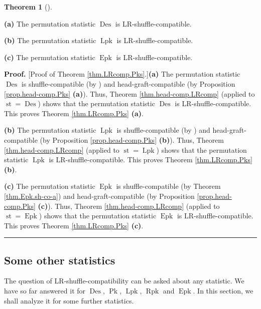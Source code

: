 \documentclass[numbers=enddot,12pt,final,onecolumn,notitlepage]{scrartcl}%
\theoremstyle{definition}
\newtheorem{theo}{Theorem}[section]
\newenvironment{theorem}[1][]
{\begin{theo}[#1]\begin{leftbar}}
{\end{leftbar}\end{theo}}
\newenvironment{proof}[1][Proof]{\noindent\textbf{#1.} }{\ \rule{0.5em}{0.5em}}
\begin{document}
\begin{theorem}
\label{thm.LRcomp.Pks}\textbf{(a)} The permutation statistic
$\operatorname{Des}$ is LR-shuffle-compatible.

\textbf{(b)} The permutation statistic $\operatorname*{Lpk}$ is LR-shuffle-compatible.

\textbf{(c)} The permutation statistic $\operatorname{Epk}$ is LR-shuffle-compatible.
\end{theorem}

\begin{proof}
[Proof of Theorem \ref{thm.LRcomp.Pks}.]\textbf{(a)} The permutation statistic
$\operatorname{Des}$ is shuffle-compatible (by \cite[\S 2.4]{part1}) and
head-graft-compatible (by Proposition \ref{prop.head-comp.Pks} \textbf{(a)}).
Thus, Theorem \ref{thm.head-comp.LRcomp} (applied to $\operatorname{st}
=\operatorname{Des}$) shows that the permutation statistic
$\operatorname{Des}$ is LR-shuffle-compatible. This proves Theorem
\ref{thm.LRcomp.Pks} \textbf{(a)}.

\textbf{(b)} The permutation statistic $\operatorname*{Lpk}$ is
shuffle-compatible (by \cite[Theorem 4.9 \textbf{(a)}]{part1}) and
head-graft-compatible (by Proposition \ref{prop.head-comp.Pks} \textbf{(b)}).
Thus, Theorem \ref{thm.head-comp.LRcomp} (applied to $\operatorname{st}
=\operatorname{Lpk}$) shows that the permutation statistic
$\operatorname{Lpk}$ is LR-shuffle-compatible. This proves Theorem
\ref{thm.LRcomp.Pks} \textbf{(b)}.

\textbf{(c)} The permutation statistic $\operatorname{Epk}$ is
shuffle-compatible (by Theorem \ref{thm.Epk.sh-co-a}) and
head-graft-compatible (by Proposition \ref{prop.head-comp.Pks} \textbf{(c)}).
Thus, Theorem \ref{thm.head-comp.LRcomp} (applied to $\operatorname{st}
=\operatorname{Epk}$) shows that the permutation statistic
$\operatorname{Epk}$ is LR-shuffle-compatible. This proves Theorem
\ref{thm.LRcomp.Pks} \textbf{(c)}.
\end{proof}

\subsection{\label{subsect.LR.others}Some other statistics}

The question of LR-shuffle-compatibility can be asked about any statistic. We
have so far answered it for $\operatorname{Des}$, $\operatorname*{Pk}$,
$\operatorname*{Lpk}$, $\operatorname*{Rpk}$ and $\operatorname{Epk}$. In
this section, we shall analyze it for some further statistics.
\end{document}
